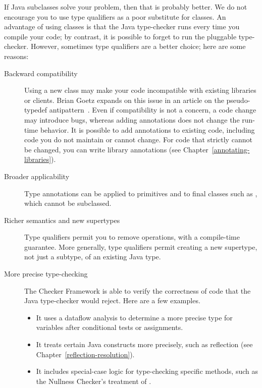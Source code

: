 If  Java subclasses solve your problem, then that is probably better.
We do not encourage you to use type qualifiers as a poor substitute for
classes.  An advantage of using classes is that the Java type-checker
runs every time you compile your code;
by contrast, it is possible to forget to run the pluggable
type-checker.  However, sometimes type qualifiers are a
better choice; here are some reasons:

\begin{description}

\item[Backward compatibility]
Using a new class may make your code incompatible with existing libraries or
clients.  Brian Goetz expands on this issue in an article on the
pseudo-typedef antipattern~\cite{Goetz2006:typedef}.  Even if compatibility
is not a concern, a code change may introduce bugs, whereas adding
annotations does not change the run-time behavior.  It is possible to add
annotations to existing code, including code you do not maintain or cannot
change.  For code that strictly cannot be changed, you
can write library annotations (see Chapter~\ref{annotating-libraries}).

\item[Broader applicability]
Type annotations can be applied to primitives and to final classes such as
, which cannot be subclassed.

\item[Richer semantics and new supertypes]
Type qualifiers permit you to remove operations, with a compile-time
guarantee.  More
generally, type qualifiers permit creating a new supertype, not just a
subtype, of an existing Java type.

\item[More precise type-checking]
The Checker Framework is able to verify the correctness of code that the
Java type-checker would reject.  Here are a few examples.
\begin{itemize}
\item
  It uses a dataflow analysis to determine a more precise type for
  variables after conditional tests or assignments.
\item
  It treats certain Java constructs more precisely, such as
  reflection (see Chapter~\ref{reflection-resolution}).
\item
  It includes special-case logic for type-checking specific methods, such
  as the Nullness Checker's treatment of .
\end{itemize}



\end{description}
